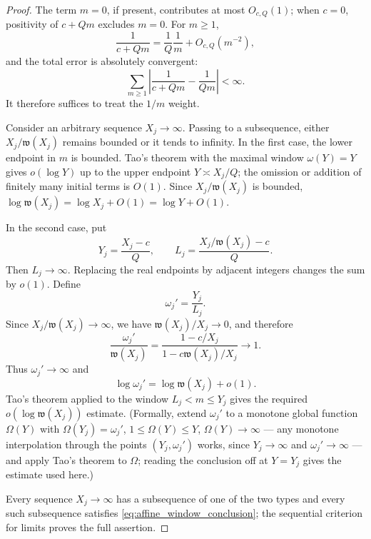 \documentclass[11pt]{amsart}
\numberwithin{equation}{section}
\theoremstyle{plain}
\theoremstyle{definition}
\theoremstyle{remark}
\newcommand{\what}{\mathfrak w}
\begin{document}
\begin{proof}
The term $m=0$, if present, contributes at most $O_{c,Q}(1)$; when $c=0$, positivity of $c+Qm$ excludes $m=0$.  For $m\ge1$,
\begin{equation}
\frac1{c+Qm}=\frac1Q\frac1m+O_{c,Q}(m^{-2}),
\label{eq:weight_affine_expansion}
\end{equation}
and the total error is absolutely convergent:
\begin{equation}
\sum_{m\ge1}\left|\frac1{c+Qm}-\frac1{Qm}\right|<\infty.
\label{eq:weight_affine_error_sum}
\end{equation}
It therefore suffices to treat the $1/m$ weight.

Consider an arbitrary sequence $X_j\to\infty$.  Passing to a subsequence, either $X_j/\what(X_j)$ remains bounded or it tends to infinity.  In the first case, the lower endpoint in $m$ is bounded.  Tao's theorem with the maximal window $\omega(Y)=Y$ gives $o(\log Y)$ up to the upper endpoint $Y\asymp X_j/Q$; the omission or addition of finitely many initial terms is $O(1)$.  Since $X_j/\what(X_j)$ is bounded, $\log\what(X_j)=\log X_j+O(1)=\log Y+O(1)$.

In the second case, put
\begin{equation}
Y_j=\frac{X_j-c}{Q},
\qquad
L_j=\frac{X_j/\what(X_j)-c}{Q}.
\label{eq:Y_L_affine_window}
\end{equation}
Then $L_j\to\infty$.  Replacing the real endpoints by adjacent integers changes the sum by $o(1)$.  Define
\begin{equation}
\omega_j'=\frac{Y_j}{L_j}.
\label{eq:omega_prime}
\end{equation}
Since $X_j/\what(X_j)\to\infty$, we have $\what(X_j)/X_j\to0$, and therefore
\begin{equation}
\frac{\omega_j'}{\what(X_j)}
=\frac{1-c/X_j}{1-c\what(X_j)/X_j}
\longrightarrow1.
\label{eq:omega_prime_asymptotic}
\end{equation}
Thus $\omega_j'\to\infty$ and
\begin{equation}
\log\omega_j'=\log\what(X_j)+o(1).
\label{eq:log_omega_prime}
\end{equation}
Tao's theorem applied to the window $L_j<m\le Y_j$ gives the required $o(\log\what(X_j))$ estimate.  (Formally, extend $\omega_j'$ to a monotone global function $\Omega(Y)$ with $\Omega(Y_j)=\omega_j'$, $1\le\Omega(Y)\le Y$, $\Omega(Y)\to\infty$ --- any monotone interpolation through the points $(Y_j,\omega_j')$ works, since $Y_j\to\infty$ and $\omega_j'\to\infty$ --- and apply Tao's theorem to $\Omega$; reading the conclusion off at $Y=Y_j$ gives the estimate used here.)

Every sequence $X_j\to\infty$ has a subsequence of one of the two types and every such subsequence satisfies \eqref{eq:affine_window_conclusion}; the sequential criterion for limits proves the full assertion.
\end{proof}
\end{document}
